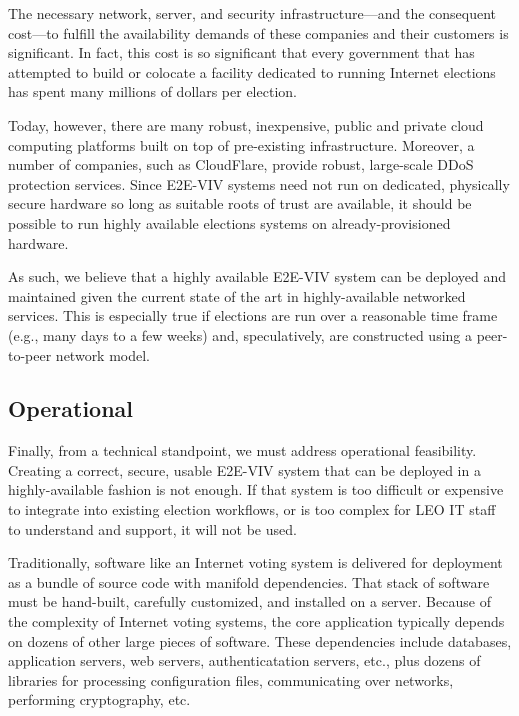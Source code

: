 The necessary network, server, and security infrastructure---and the
consequent cost---to fulfill the availability demands of these
companies and their customers is significant. In fact, this cost is so
significant that every government that has attempted to build or
colocate a facility dedicated to running Internet elections has spent
many millions of dollars per election.

Today, however, there are many robust, inexpensive, public and private
cloud computing platforms built on top of pre-existing
infrastructure. Moreover, a number of companies, such as CloudFlare,
provide robust, large-scale DDoS protection services. Since E2E-VIV
systems need not run on dedicated, physically secure hardware so long
as suitable roots of trust are available, it should be possible to run
highly available elections systems on already-provisioned hardware.

As such, we believe that a highly available E2E-VIV system can be
deployed and maintained given the current state of the art in
highly-available networked services. This is especially true if
elections are run over a reasonable time frame (e.g., many days to a
few weeks) and, speculatively, are constructed using a peer-to-peer
network model.

\subsection{Operational}
\label{sec:operational}

Finally, from a technical standpoint, we must address operational
feasibility. Creating a correct, secure, usable E2E-VIV system that
can be deployed in a highly-available fashion is not enough. If that
system is too difficult or expensive to integrate into existing
election workflows, or is too complex for LEO IT staff to understand
and support, it will not be used.

Traditionally, software like an Internet voting system is delivered
for deployment as a bundle of source code with manifold
dependencies. That stack of software must be hand-built, carefully
customized, and installed on a server.  Because of the complexity of
Internet voting systems, the core application typically depends on
dozens of other large pieces of software.  These dependencies include
databases, application servers, web servers, authenticatation servers,
etc., plus dozens of libraries for processing configuration files,
communicating over networks, performing cryptography, etc.

